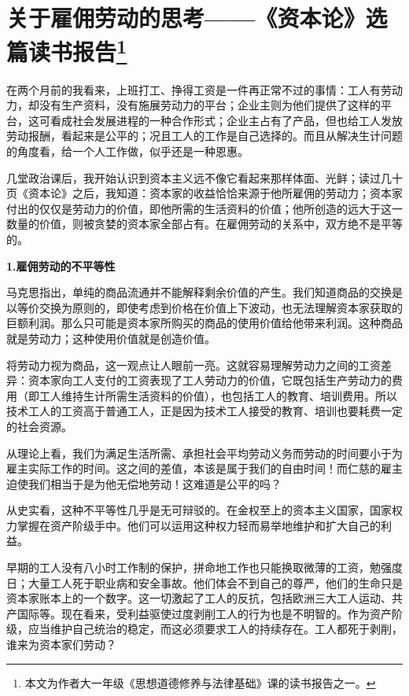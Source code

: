 \section*{关于雇佣劳动的思考——《资本论》选篇读书报告\footnote{本文为作者大一年级《思想道德修养与法律基础》课的读书报告之一。}}

\par 在两个月前的我看来，上班打工、挣得工资是一件再正常不过的事情：工人有劳动力，却没有生产资料，没有施展劳动力的平台；企业主则为他们提供了这样的平台，这可看成社会发展进程的一种合作形式；企业主占有了产品，但也给工人发放劳动报酬，看起来是公平的；况且工人的工作是自己选择的。而且从解决生计问题的角度看，给一个人工作做，似乎还是一种恩惠。
\par 几堂政治课后，我开始认识到资本主义远不像它看起来那样体面、光鲜；读过几十页《资本论》之后，我知道：资本家的收益恰恰来源于他所雇佣的劳动力；资本家付出的仅仅是劳动力的价值，即他所需的生活资料的价值；他所创造的远大于这一数量的价值，则被贪婪的资本家全部占有。在雇佣劳动的关系中，双方绝不是平等的。
\par \textbf{1.雇佣劳动的不平等性}
\par 马克思指出，单纯的商品流通并不能解释剩余价值的产生。我们知道商品的交换是以等价交换为原则的，即使考虑到价格在价值上下波动，也无法理解资本家获取的巨额利润。那么只可能是资本家所购买的商品的使用价值给他带来利润。这种商品就是劳动力；这种使用价值就是创造价值。
\par 将劳动力视为商品，这一观点让人眼前一亮。这就容易理解劳动力之间的工资差异：资本家向工人支付的工资表现了工人劳动力的价值，它既包括生产劳动力的费用（即工人维持生计所需生活资料的价值），也包括工人的教育、培训费用。所以技术工人的工资高于普通工人，正是因为技术工人接受的教育、培训也要耗费一定的社会资源。
\par 从理论上看，我们为满足生活所需、承担社会平均劳动义务而劳动的时间要小于为雇主实际工作的时间。这之间的差值，本该是属于我们的自由时间！而仁慈的雇主迫使我们相当于是为他无偿地劳动！这难道是公平的吗？
\par 从史实看，这种不平等性几乎是无可辩驳的。在金权至上的资本主义国家，国家权力掌握在资产阶级手中。他们可以运用这种权力轻而易举地维护和扩大自己的利益。
\par 早期的工人没有八小时工作制的保护，拼命地工作也只能换取微薄的工资，勉强度日；大量工人死于职业病和安全事故。他们体会不到自己的尊严，他们的生命只是资本家账本上的一个数字。这一切激起了工人的反抗，包括欧洲三大工人运动、共产国际等。现在看来，受利益驱使过度剥削工人的行为也是不明智的。作为资产阶级，应当维护自己统治的稳定，而这必须要求工人的持续存在。工人都死于剥削，谁来为资本家们劳动？
